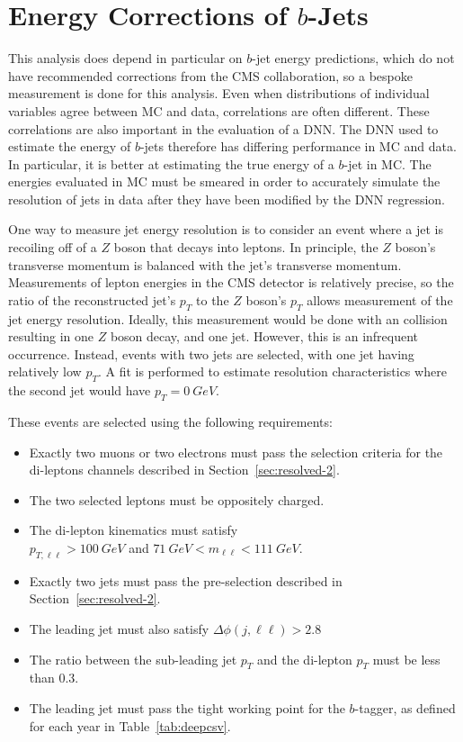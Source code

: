 \section{Energy Corrections of $b$-Jets}

This analysis does depend in particular on $b$-jet energy predictions,
which do not have recommended corrections from the CMS collaboration,
so a bespoke measurement is done for this analysis.
Even when distributions of individual variables agree between MC and data,
correlations are often different.
These correlations are also important in the evaluation of a DNN.
The DNN used to estimate the energy of $b$-jets therefore has differing performance
in MC and data.
In particular, it is better at estimating the true energy of a $b$-jet in MC.
The energies evaluated in MC must be smeared in order to accurately simulate
the resolution of jets in data after they have been modified by the DNN regression.

One way to measure jet energy resolution is to consider an event
where a jet is recoiling off of a $Z$ boson that decays into leptons.
In principle, the $Z$ boson's transverse momentum is balanced with the
jet's transverse momentum.
Measurements of lepton energies in the CMS detector is relatively precise,
so the ratio of the reconstructed jet's
$p_T$ to the $Z$ boson's $p_T$ allows measurement of the jet energy resolution.
Ideally, this measurement would be done with an collision resulting in one $Z$ boson decay,
and one jet.
However, this is an infrequent occurrence.
Instead, events with two jets are selected, with one jet having relatively low $p_T$.
A fit is performed to estimate resolution characteristics
where the second jet would have $p_T = \SI{0}{GeV}$.

These events are selected using the following requirements:

\begin{itemize}
\item Exactly two muons or two electrons must pass the selection criteria for the
  di-leptons channels described in Section~\ref{sec:resolved-2}.
\item The two selected leptons must be oppositely charged.
\item The di-lepton kinematics must satisfy \\ $p_{T,\ell\ell} > \SI{100}{GeV}$ and
  $\SI{71}{GeV} < m_{\ell\ell} < \SI{111}{GeV}$.
\item Exactly two jets must pass the pre-selection described in Section~\ref{sec:resolved-2}.
\item The leading jet must also satisfy $\Delta\phi(j, \ell\ell) > 2.8$
\item The ratio between the sub-leading jet $p_T$ and
  the di-lepton $p_T$ must be less than 0.3.
\item The leading jet must pass the tight working point for the $b$-tagger,
  as defined for each year in Table~\ref{tab:deepcsv}.
\end{itemize}

